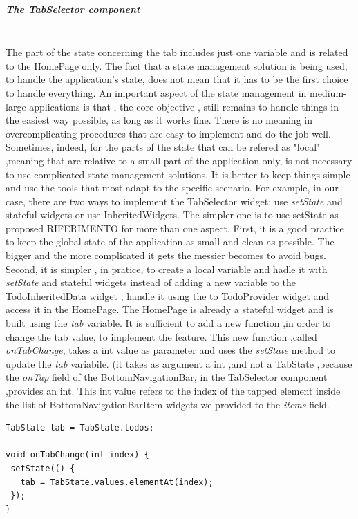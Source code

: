 \subparagraph{The TabSelector component}\mbox{}\\
\label{subpar:todo_app_inherited_widget_tabselector_component}
The part of the state concerning the tab includes just one variable and is related to the HomePage only. The fact that a state management solution is being used, to handle the application's state, does not mean that it has to be the first choice to handle everything. An important aspect of the state management in medium-large applications is that , the core objective , still remains to handle things in the easiest way possible, as long as it works fine. There is no meaning in overcomplicating procedures that are easy to implement and do the job well. Sometimes, indeed, for the parts of the state that can be refered as "local" ,meaning that are relative to a small part of the application only, is not necessary to use complicated state management solutions. It is better to keep things simple and use the tools that most adapt to the specific scenario.
For example, in our case, there are two ways to implement the TabSelector widget: use \textit{setState} and stateful widgets or use InheritedWidgets. The simpler one is to use setState as proposed RIFERIMENTO for more than one aspect. First, it is a good practice to keep the global state of the application as small and clean as possible. The bigger and the more complicated it gets the messier becomes to avoid bugs. Second, it is simpler , in pratice, to create a local variable and hadle it with \textit{setState} and stateful widgets instead of adding a new variable to the TodoInheritedData widget , handle it using the to TodoProvider widget and  access it in the HomePage. The HomePage is already a stateful widget and is built using the \textit{tab }variable. It is sufficient to add a new function ,in order to change the tab value, to implement the feature. This new function ,called \textit{onTabChange}, takes a int value as parameter and uses the \textit{setState} method to update the \textit{tab} variabile. (it takes as argument a int ,and not a TabState ,because the \textit{onTap} field of the BottomNavigationBar, in the TabSelector component ,provides an int. This int value refers to the index of the tapped element inside the list of BottomNavigationBarItem widgets we provided to the \textit{items} field.
\mbox{}\\
\begin{code}

\label{code:2.29}
\begin{verbatim}
TabState tab = TabState.todos;

void onTabChange(int index) {
 setState(() {
   tab = TabState.values.elementAt(index);
 });
}
\end{verbatim}
\end{code}
\mbox{}\\

